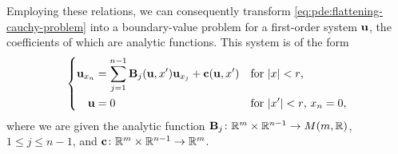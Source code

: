 Employing these relations, we can consequently transform
\eqref{eq:pde:flattening-cauchy-problem} into a boundary-value problem for
a first-order system \(\mathbf{u}\), the coefficients of which are analytic
functions. This system is of the form
\begin{equation}
  \label{eq:pde:cauchy-problem-to-analytic-system}
  \left\{
    \begin{aligned}
      \mathbf{u}_{x_n}&=\sum_{j=1}^{n-1}\mathbf{B}_j(\mathbf{u},x')\mathbf{u}_{x_j}+\mathbf{c}(\mathbf{u},x')
      &&\text{for \(|x|<r\),}\\
      \mathbf{u}&=0&&\text{for \(|x'|<r\), \(x_n=0\),}
    \end{aligned}
  \right.
\end{equation}
where we are given the analytic function
\(\mathbf{B}_j\colon\mathbb{R}^m\times\mathbb{R}^{n-1}\to M(m,\mathbb{R})\), \(1\leq j\leq n-1\),
and \(\mathbf{c}\colon\mathbb{R}^{m}\times\mathbb{R}^{n-1}\to\mathbb{R}^m\).

